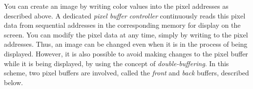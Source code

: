 You can create an image by writing color values into the pixel addresses as described
above. A dedicated {\it pixel buffer controller} continuously reads this pixel 
data from sequential addresses in the corresponding
memory for display on the screen.  You can modify the pixel data at any time, simply
by writing to the pixel addresses. Thus, an image can be changed even when it is in the
process of being displayed.  However, it is also possible to avoid making changes to 
the pixel buffer while it is being displayed, by using the concept of {\it
double-buffering}.  In this scheme, two pixel buffers are involved, called the {\it front} 
and {\it back} buffers, described below.

